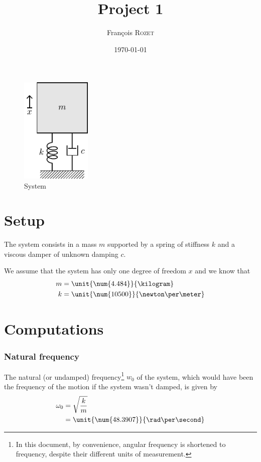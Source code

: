\documentclass[a4paper, 12pt]{article}
\title{Project 1}
\author{François \textsc{Rozet}}
\date{\today}
\begin{document}
	
	{
		\begin{figure}
			\centering
			\includegraphics[width=0.3\textwidth]{resources/tikz/1dof_system/1dof_system.pdf}
			\caption{System}
		\end{figure}
		\part*{Setup}
		The system consists in a mass $m$ supported by a spring of stiffness $k$ and a viscous damper of unknown damping $c$. \par
		We assume that the system has only one degree of freedom $x$ and we know that
		\begin{align*}
			m & = \unit{\num{4.484}}{\kilogram} \\
			k & = \unit{\num{10500}}{\newton\per\meter}
		\end{align*}
	}
	\part*{Computations}
	\section{Natural frequency}
	The natural (or undamped) frequency\footnote{In this document, by convenience, angular frequency is shortened to frequency, despite their different units of measurement.} $w_0$ of the system, which would have been the frequency of the motion if the system wasn't damped, is given by
	\begin{align*}
		\omega_0 & = \sqrt{\frac{k}{m}} \\
			& = \unit{\num{48.3907}}{\rad\per\second}
	\end{align*}
	\setcounter{section}{2}
\end{document}
